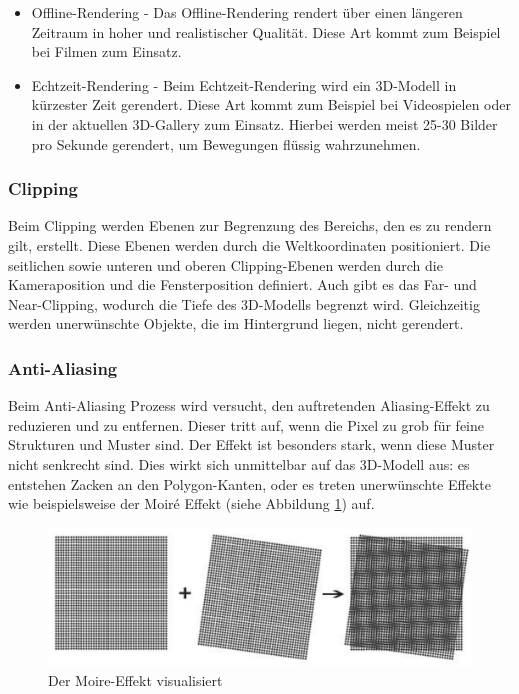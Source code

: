 \begin{itemize}
    \item Offline-Rendering - Das Offline-Rendering rendert über einen längeren Zeitraum in hoher und realistischer Qualität. Diese Art kommt zum Beispiel bei Filmen zum Einsatz. \cite{RenderArten}
    \item Echtzeit-Rendering - Beim Echtzeit-Rendering wird ein 3D-Modell in kürzester Zeit gerendert. Diese Art kommt zum Beispiel bei Videospielen oder in der aktuellen 3D-Gallery zum Einsatz. Hierbei werden meist 25-30 Bilder pro Sekunde gerendert, um Bewegungen flüssig wahrzunehmen. \cite{RenderArten}
\end{itemize}


\subsubsection{Clipping}
\label{clipping}
Beim Clipping werden Ebenen zur Begrenzung des Bereichs, den es zu rendern gilt, erstellt. Diese Ebenen werden durch die Weltkoordinaten positioniert. Die seitlichen sowie unteren und oberen Clipping-Ebenen werden durch die Kameraposition und die Fensterposition definiert. Auch gibt es das Far- und Near-Clipping, wodurch die Tiefe des 3D-Modells begrenzt wird. Gleichzeitig werden unerwünschte Objekte, die im Hintergrund liegen, nicht gerendert. \cite{Rendering3DModels}


\subsubsection{Anti-Aliasing}
Beim Anti-Aliasing Prozess wird versucht, den auftretenden Aliasing-Effekt zu reduzieren und zu entfernen. Dieser tritt auf, wenn die Pixel zu grob für feine Strukturen und Muster sind. Der Effekt ist besonders stark, wenn diese Muster nicht senkrecht sind. Dies wirkt sich unmittelbar auf das 3D-Modell aus: es entstehen Zacken an den Polygon-Kanten, oder es treten unerwünschte Effekte wie beispielsweise der Moiré Effekt (siehe Abbildung \ref{fig:impl:MoireEffekt}) auf. 
\cite{Rendering3DModels} 
\begin{figure}
    \centering
    \includegraphics[scale=0.3]{pics/moire-effekt.jpg}
    \caption{Der Moire-Effekt visualisiert \cite{MoireEffekt}}
    \label{fig:impl:MoireEffekt}
\end{figure}

